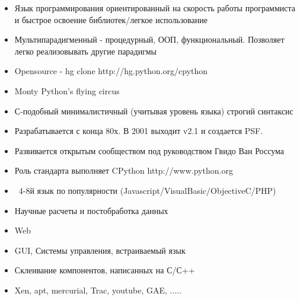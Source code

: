 \documentclass{article}
\begin{document}
\begin{itemize}
    \item Язык программирования ориентированный на скорость работы программиста и
        быстрое освоение библиотек/легкое использование
    \item Мультипарадигменный - процедурный, ООП, функциональный. Позволяет легко реализовывать другие парадигмы
    \item Opensource - hg clone http://hg.python.org/cpython
    \item Monty Python's flying circus
    \item С-подобный минималистичный (учитывая уровень языка) строгий синтаксис
    \item Разрабатывается с конца 80х. В 2001 выходит v2.1 и создается PSF.
    \item Развивается открытым сообществом под руководством Гвидо Ван Россума
    \item Роль стандарта выполняет CPython http://www.python.org
\end{itemize}
\newpage

\begin{itemize}
    \item ~4-8й язык по популярности (Javascript/VisualBasic/ObjectiveC/PHP)
    \item Научные расчеты и постобработка данных
    \item Web
    \item GUI, Системы управления, встраиваемый язык
    \item Склеивание компонентов, написанных на С/С++
    \item Xen, apt, mercurial, Trac, youtube, GAE, .....
\end{itemize}
\newpage
\end{document}
